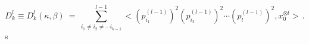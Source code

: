 \begin{equation}
D_k^{l} \equiv D_k^l(\kappa , \beta) \ = \ \sum_{i_1\neq
i_2\neq\cdots i_{k-1}}^{l-1} < (p_{i_1}^{(l-1)})^2
(p_{i_2}^{(l-1)})^2\cdots (p_{l}^{(l-1)})^2 , x_0^{\otimes l} >\,
. \label{442}\end{equation}s
